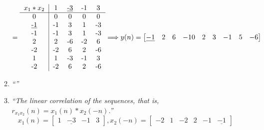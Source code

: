 \documentclass{article}
\begin{document}
\begin{enumerate}
\begin{enumerate}
                \begin{displaymath}
                    =
                    \begin{tabular}{c | c c c c}
                        $x_1 * x_2  $ &  1   &  \underline{-3}  &  -1  &  3   \\
                         \hline
                         0  &   0  &  0   &  0   &   0  \\
                         \underline{-1}& -1   &  3   &  1   &  -3  \\
                         -1 & -1   &  3   &  1   &  -3  \\
                         2  &  2   & -6   &  -2  &  6   \\
                         -2 &  -2  &  6   &  2   &  -6  \\
                         1  &  1   &  -3  &  -1  &  3   \\
                         -2 &  -2  &  6   &  2   &  -6
                    \end{tabular}
                    \Longrightarrow
                    y(n)=
                    \begin{bmatrix}
                        \underline{-1} & 2 & 6 & -10 & 2 & 3 & -1 & 5 & -6
                    \end{bmatrix}
                \end{displaymath}
            \item %
                \emph{``''}
                \\
            \item %
                \emph{``The linear correlation of the sequences, that is, $r_{x_1x_2}(n)=x_1(n)*x_2(-n)$.''}
                \\
                \begin{displaymath}
                    x_1(n) = 
                    \begin{bmatrix}
                        1 & \underline{-3} & -1 & 3
                    \end{bmatrix}
                    ,
                    x_2(-n) = 
                    \begin{bmatrix}
                       -2&1 & -2 & 2 & -1 & \underline{-1} 
                    \end{bmatrix}
                \end{displaymath}


\end{enumerate}
\end{enumerate}
\end{document}

